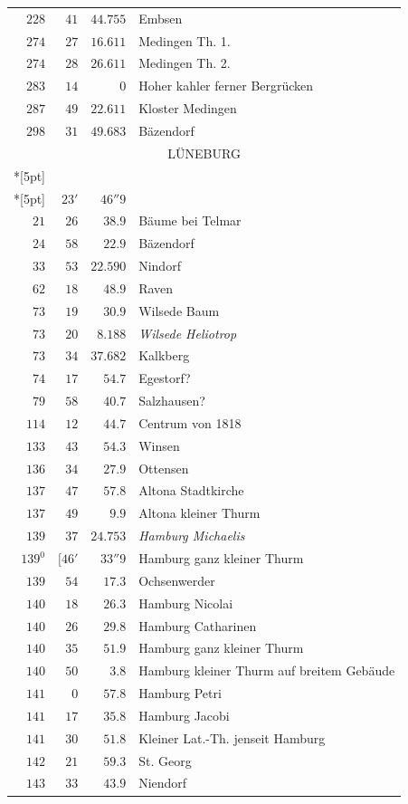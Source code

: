 \begin{longtable}{@{}rrrp{.61\linewidth}@{}}
\(228\)&\(41\)&\(44.755\)&\raggedright Embsen\tabularnewline
\(274\)&\(27\)&\(16.611\)&\raggedright Medingen Th. 1.\tabularnewline
\(274\)&\(28\)&\(26.611\)&\raggedright Medingen Th. 2.\tabularnewline
\(283\)&\(14\)&\(0\)&\raggedright Hoher kahler ferner Bergrücken\tabularnewline
\(287\)&\(49\)&\(22.611\)&\raggedright Kloster Medingen\tabularnewline
\(298\)&\(31\)&\(49.683\)&\raggedright Bäzendorf\tabularnewline
\multicolumn{4}{c}{\strut LÜNEBURG}\\*[5pt]
\multicolumn{4}{c}{Hauptplatz \(-191597.163\)\qquad\(-30574.951\)}\\*[5pt]
\multicolumn{3}{r}{\begin{tabular}{@{}rrr|@{}}\(21^{0}\)&\(23'\)&\(46''9\)\\
\(21\)&\(26\)&\(38.9\)\end{tabular}}&\raggedright Bäume bei Telmar\tabularnewline
\(24\)&\(58\)&\(22.9\)&\raggedright Bäzendorf\tabularnewline
\(33\)&\(53\)&\(22.590\)&\raggedright Nindorf\tabularnewline
\(62\)&\(18\)&\(48.9\)&\raggedright Raven\tabularnewline
\(73\)&\(19\)&\(30.9\)&\raggedright Wilsede Baum\tabularnewline
\(73\)&\(20\)&\(8.188\)&\raggedright \textit{Wilsede Heliotrop}\tabularnewline
\(73\)&\(34\)&\(37.682\)&\raggedright Kalkberg\tabularnewline
\(74\)&\(17\)&\(54.7\)&\raggedright Egestorf?\tabularnewline
\(79\)&\(58\)&\(40.7\)&\raggedright Salzhausen?\tabularnewline
\(114\)&\(12\)&\(44.7\)&\raggedright Centrum von 1818\tabularnewline
\(133\)&\(43\)&\(54.3\)&\raggedright Winsen\tabularnewline
\(136\)&\(34\)&\(27.9\)&\raggedright Ottensen\tabularnewline
\(137\)&\(47\)&\(57.8\)&\raggedright Altona Stadtkirche\tabularnewline
\(137\)&\(49\)&\(9.9\)&\raggedright Altona kleiner Thurm\tabularnewline
\(139\)&\(37\)&\(24.753\)&\raggedright \textit{Hamburg Michaelis}\tabularnewline
\(139^{0}\)&\([46'\)&\(33''9\)&\raggedright Hamburg ganz kleiner Thurm\tabularnewline
\(139\)&\(54\)&\(17.3\)&\raggedright Ochsenwerder\tabularnewline
\(140\)&\(18\)&\(26.3\)&\raggedright Hamburg Nicolai\tabularnewline
\(140\)&\(26\)&\(29.8\)&\raggedright Hamburg Catharinen\tabularnewline
\(140\)&\(35\)&\(51.9\)&\raggedright Hamburg ganz kleiner Thurm\tabularnewline
\(140\)&\(50\)&\(3.8\)&\raggedright Hamburg kleiner Thurm auf breitem Gebäude\tabularnewline
\(141\)&\(0\)&\(57.8\)&\raggedright Hamburg Petri\tabularnewline
\(141\)&\(17\)&\(35.8\)&\raggedright Hamburg Jacobi\tabularnewline
\(141\)&\(30\)&\(51.8\)&\raggedright Kleiner Lat.-Th. jenseit Hamburg\tabularnewline
\(142\)&\(21\)&\(59.3\)&\raggedright St. Georg\tabularnewline
\(143\)&\(33\)&\(43.9\)&\raggedright Niendorf\tabularnewline

\end{longtable}
